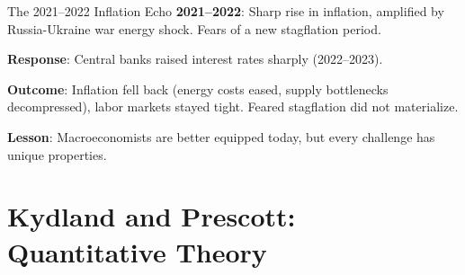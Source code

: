 \documentclass[blue]{beamer}
\begin{document}
\begin{frame}{The 2021--2022 Inflation Echo}
	\textbf{2021--2022}: Sharp rise in inflation, amplified by Russia-Ukraine war energy shock. Fears of a new stagflation period.
	
	\bigskip
	\textbf{Response}: Central banks raised interest rates sharply (2022--2023).
	
	\bigskip
	\textbf{Outcome}: Inflation fell back (energy costs eased, supply bottlenecks decompressed), labor markets stayed tight. Feared stagflation did not materialize.
	
	\bigskip
	\textbf{Lesson}: Macroeconomists are better equipped today, but every challenge has unique properties.
\end{frame}


\section{Kydland and Prescott: Quantitative Theory}
\end{document}
